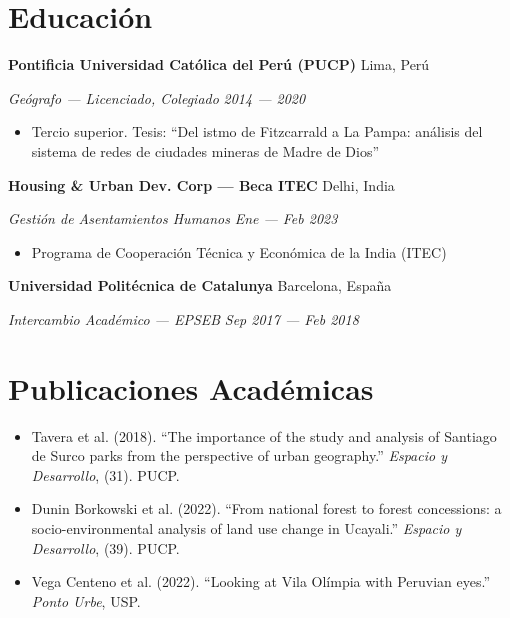\documentclass[11pt,letterpaper]{article}
\newcommand{\entry}[4]{%
  \noindent\textbf{#1} \hfill #2 \par\nopagebreak
  \textit{#3} \hfill \textit{#4} \par\nopagebreak
}
\begin{document}
\section{Educaci\'on}

\entry{Pontificia Universidad Cat\'olica del Per\'u (PUCP)}{Lima, Per\'u}{Ge\'ografo --- Licenciado, Colegiado}{2014 --- 2020}
\begin{itemize}
  \item Tercio superior. Tesis: ``Del istmo de Fitzcarrald a La Pampa: an\'alisis del sistema de redes de ciudades mineras de Madre de Dios''
\end{itemize}
\vspace{0.3em}

\entry{Housing \& Urban Dev. Corp --- Beca ITEC}{Delhi, India}{Gesti\'on de Asentamientos Humanos}{Ene --- Feb 2023}
\begin{itemize}
  \item Programa de Cooperaci\'on T\'ecnica y Econ\'omica de la India (ITEC)
\end{itemize}
\vspace{0.3em}

\entry{Universidad Polit\'ecnica de Catalunya}{Barcelona, Espa\~na}{Intercambio Acad\'emico --- EPSEB}{Sep 2017 --- Feb 2018}
\vspace{0.3em}

\section{Publicaciones Acad\'emicas}

\begin{itemize}
  \item Tavera et al. (2018). ``The importance of the study and analysis of Santiago de Surco parks from the perspective of urban geography.'' \textit{Espacio y Desarrollo}, (31). PUCP.
  \item Dunin Borkowski et al. (2022). ``From national forest to forest concessions: a socio-environmental analysis of land use change in Ucayali.'' \textit{Espacio y Desarrollo}, (39). PUCP.
  \item Vega Centeno et al. (2022). ``Looking at Vila Ol\'impia with Peruvian eyes.'' \textit{Ponto Urbe}, USP.
\end{itemize}
\vspace{0.3em}

\end{document}
